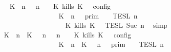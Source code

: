 \begin{isabellebody}
\ \isamarkupfalse%
\ {\isacartoucheopen}{\isasymlbrakk}\ {\isacharparenleft}{\isacharparenleft}K\ {\isasymnot}{\isasymUp}\ n{\isacharparenright}\ {\isacharhash}\ {\isasymGamma}{\isacharparenright}{\isacharcomma}\ n\ {\isasymturnstile}\ {\isasymPsi}\ {\isasymtriangleright}\ {\isacharparenleft}{\isacharparenleft}K\ kills\ K\ {\isacharhash}\ {\isasymPhi}{\isacharparenright}\ {\isasymrbrakk}\isactrlsub c\isactrlsub o\isactrlsub n\isactrlsub f\isactrlsub i\isactrlsub g\isanewline
\ \ \ \ \ \ \ \ \ \ \ \ \ \ \ \ {\isacharequal}\ {\isasymlbrakk}{\isasymlbrakk}\ {\isacharparenleft}K\ {\isasymnot}{\isasymUp}\ n{\isacharparenright}\ {\isacharhash}\ {\isasymGamma}\ {\isasymrbrakk}{\isasymrbrakk}\isactrlsub p\isactrlsub r\isactrlsub i\isactrlsub m\ {\isasyminter}\ {\isasymlbrakk}{\isasymlbrakk}\ {\isasymPsi}\ {\isasymrbrakk}{\isasymrbrakk}\isactrlsub T\isactrlsub E\isactrlsub S\isactrlsub L\isactrlbsup {\isasymge}\ n\isactrlesup \isanewline
\ \ \ \ \ \ \ \ \ \ \ \ \ \ \ \ \ \ {\isasyminter}\ {\isasymlbrakk}{\isasymlbrakk}\ {\isacharparenleft}K\ kills\ K\ {\isacharhash}\ {\isasymPhi}\ {\isasymrbrakk}{\isasymrbrakk}\isactrlsub T\isactrlsub E\isactrlsub S\isactrlsub L\isactrlbsup {\isasymge}\ Suc\ n\isactrlesup {\isacartoucheclose}\ \isamarkupfalse%
\ simp\isanewline
\ \ \isamarkupfalse%
\ \isamarkupfalse%
\ {\isacartoucheopen}{\isasymlbrakk}\ {\isacharparenleft}{\isacharparenleft}K\ {\isasymUp}\ n{\isacharparenright}\ {\isacharhash}\ {\isacharparenleft}K\ {\isasymnot}{\isasymUp}\ {\isasymge}\ n{\isacharparenright}\ {\isacharhash}\ {\isasymGamma}{\isacharparenright}{\isacharcomma}\ n\ {\isasymturnstile}\ {\isasymPsi}\ {\isasymtriangleright}\ {\isacharparenleft}{\isacharparenleft}K\ kills\ K\ {\isacharhash}\ {\isasymPhi}{\isacharparenright}\ {\isasymrbrakk}\isactrlsub c\isactrlsub o\isactrlsub n\isactrlsub f\isactrlsub i\isactrlsub g\isanewline
\ \ \ \ \ \ \ \ \ \ \ \ \ \ \ \ {\isacharequal}\ {\isasymlbrakk}{\isasymlbrakk}\ {\isacharparenleft}K\ {\isasymUp}\ n{\isacharparenright}\ {\isacharhash}\ {\isacharparenleft}K\ {\isasymnot}{\isasymUp}\ {\isasymge}\ n{\isacharparenright}\ {\isacharhash}\ {\isasymGamma}\ {\isasymrbrakk}{\isasymrbrakk}\isactrlsub p\isactrlsub r\isactrlsub i\isactrlsub m\ {\isasyminter}\ {\isasymlbrakk}{\isasymlbrakk}\ {\isasymPsi}\ {\isasymrbrakk}{\isasymrbrakk}\isactrlsub T\isactrlsub E\isactrlsub S\isactrlsub L\isactrlbsup {\isasymge}\ n\isactrlesup \isanewline

\end{isabellebody}
